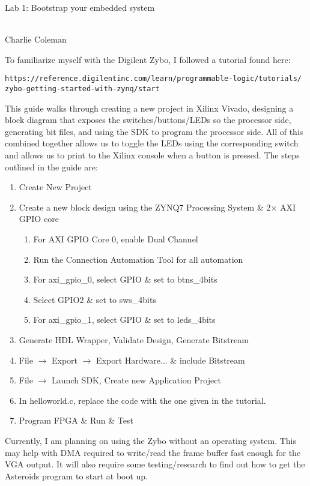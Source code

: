 \documentclass[12pt]{article}
\begin{document}
	\begin{center}\begin{large}Lab 1: Bootstrap your embedded system\end{large}\\Charlie Coleman\end{center}
	
	To familiarize myself with the Digilent Zybo, I followed a tutorial found here:
	
	\begin{footnotesize}\begin{center}
	\noindent \texttt{https://reference.digilentinc.com/learn/programmable-logic/tutorials/\\zybo-getting-started-with-zynq/start}
	\end{center}\end{footnotesize}
	
	\noindent This guide walks through creating a new project in Xilinx Vivado, designing a block diagram that exposes the switches/buttons/LEDs so the processor side, generating bit files, and using the SDK to program the  processor side. All of this combined together allows us to toggle the LEDs using the corresponding switch and allows us to print to the Xilinx console when a button is pressed. The steps outlined in the guide are:
	
	\begin{enumerate}
		\item Create New Project
		\item Create a new block design using the ZYNQ7 Processing System \& 2$\times$ AXI GPIO core
		\begin{enumerate}
			\item For AXI GPIO Core 0, enable Dual Channel
			\item Run the Connection Automation Tool for all automation
			\item For axi\_gpio\_0, select GPIO \& set to btns\_4bits
			\item Select GPIO2 \& set to sws\_4bits
			\item For axi\_gpio\_1, select GPIO \& set to leds\_4bits
		\end{enumerate}
		\item Generate HDL Wrapper, Validate Design, Generate Bitstream
		\item File $\rightarrow$ Export $\rightarrow$ Export Hardware... \& include Bitstream
		\item File $\rightarrow$ Launch SDK, Create new Application Project
		\item In helloworld.c, replace the code with the one given in the tutorial.
		\item Program FPGA \& Run \& Test
	\end{enumerate}
	
	Currently, I am planning on using the Zybo without an operating system. This may help with DMA required to write/read the frame buffer fast enough for the VGA output. It will also require some testing/research to find out how to get the Asteroids program to start at boot up.
\end{document}
